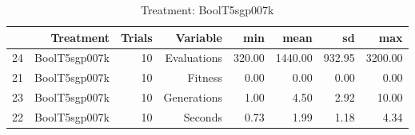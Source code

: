 \begin{table}[ht]
\centering
\begin{tabular}{rrrrrrrr}
  \hline
 & Treatment & Trials & Variable & min & mean & sd & max \\ 
  \hline
24 & BoolT5sgp007k &  10 & Evaluations & 320.00 & 1440.00 & 932.95 & 3200.00 \\ 
  21 & BoolT5sgp007k &  10 & Fitness & 0.00 & 0.00 & 0.00 & 0.00 \\ 
  23 & BoolT5sgp007k &  10 & Generations & 1.00 & 4.50 & 2.92 & 10.00 \\ 
  22 & BoolT5sgp007k &  10 & Seconds & 0.73 & 1.99 & 1.18 & 4.34 \\ 
   \hline
\end{tabular}
\caption{Treatment: BoolT5sgp007k} 
\end{table}
